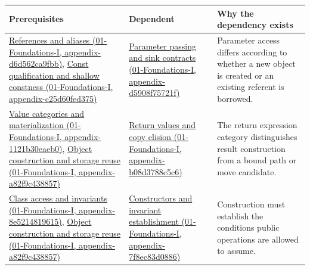 {\def\LTcaptype{none} %
\begin{longtable}[]{@{}
  >{\raggedright\arraybackslash}p{}
  >{\raggedright\arraybackslash}p{}
  >{\raggedright\arraybackslash}p{}@{}}
\toprule\noalign{}
\begin{minipage}[b]{\linewidth}\raggedright
Prerequisites
\end{minipage} & \begin{minipage}[b]{\linewidth}\raggedright
Dependent
\end{minipage} & \begin{minipage}[b]{\linewidth}\raggedright
Why the dependency exists
\end{minipage} \\
\midrule\noalign{}
\endhead
\bottomrule\noalign{}
\endlastfoot
\href{../01-Foundations-I/main.pdf\#nameddest=appendix-d6d562ca9fbb}{References and aliases (01-Foundations-I, appendix-d6d562ca9fbb)}, \href{../01-Foundations-I/main.pdf\#nameddest=appendix-c25d60fed375}{Const qualification and shallow constness (01-Foundations-I, appendix-c25d60fed375)} & \href{../01-Foundations-I/main.pdf\#nameddest=appendix-d5908f75721f}{Parameter passing and sink contracts (01-Foundations-I, appendix-d5908f75721f)} & Parameter access differs according to whether a new object is created or an existing referent is borrowed. \\
\href{../01-Foundations-I/main.pdf\#nameddest=appendix-1121b30eaeb0}{Value categories and materialization (01-Foundations-I, appendix-1121b30eaeb0)}, \href{../01-Foundations-I/main.pdf\#nameddest=appendix-a82f9c438857}{Object construction and storage reuse (01-Foundations-I, appendix-a82f9c438857)} & \href{../01-Foundations-I/main.pdf\#nameddest=appendix-b08d3788c5c6}{Return values and copy elision (01-Foundations-I, appendix-b08d3788c5c6)} & The return expression category distinguishes result construction from a bound path or move candidate. \\
\href{../01-Foundations-I/main.pdf\#nameddest=appendix-8e5214819615}{Class access and invariants (01-Foundations-I, appendix-8e5214819615)}, \href{../01-Foundations-I/main.pdf\#nameddest=appendix-a82f9c438857}{Object construction and storage reuse (01-Foundations-I, appendix-a82f9c438857)} & \href{../01-Foundations-I/main.pdf\#nameddest=appendix-7f8ec83d0886}{Constructors and invariant establishment (01-Foundations-I, appendix-7f8ec83d0886)} & Construction must establish the conditions public operations are allowed to assume. \\

\end{longtable}}
